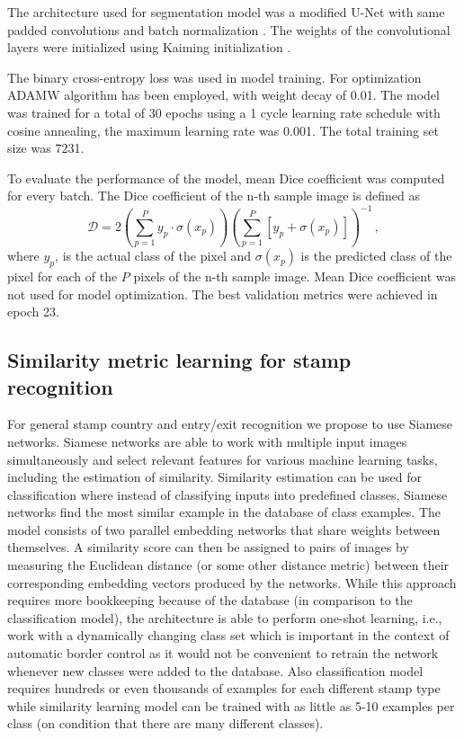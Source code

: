 \documentclass[twocolumn]{svjour3}
\begin{document}
The architecture used for segmentation model was a modified U-Net \cite{ronneberger_u-net_2015} with same padded convolutions and batch normalization \cite{batchnorm}. The weights of the convolutional layers were initialized using Kaiming initialization \cite{kaiming_init}.

The binary cross-entropy loss was used in model training. For optimization ADAMW \cite{adamw} algorithm has been employed, with weight decay of 0.01. The model was trained for a total of 30 epochs using a 1 cycle learning rate schedule \cite{smith_disciplined_2018} with cosine annealing, the maximum learning rate was 0.001. The total training set size was 7231.

To evaluate the performance of the model, mean Dice coefficient was computed for every batch. The Dice coefficient of the n-th sample image is defined as
\begin{equation}
    \mathcal{D} =2\left(\sum_{p=1}^{P}y_p\cdot\sigma(x_p)\right)
    \left(\sum_{p=1}^{P}[y_p + \sigma(x_p)]\right)^{-1}\,,
\end{equation}
where $y_p$, is the actual class of the pixel and $\sigma(x_p)$ is the predicted class of the pixel for each of the $P$ pixels of the n-th sample image. Mean Dice coefficient was not used for model optimization. The best validation metrics were achieved in epoch 23.

\subsection{Similarity metric learning for stamp recognition}
\label{sec:similarity_methods}

For general stamp country and entry/exit recognition we propose to use Siamese networks.
Siamese networks \cite{taigman_deepface_2014} are able to work with multiple input images simultaneously and select relevant features for various machine learning tasks, including the estimation of similarity. Similarity estimation can be used for classification where instead of classifying inputs into predefined classes, Siamese networks find the most similar example in the database of class examples. The model consists of two parallel embedding networks that share weights between themselves. A similarity score can then be assigned to pairs of images by measuring the Euclidean distance (or some other distance metric) between their corresponding embedding vectors produced by the networks. While this approach requires more bookkeeping because of the database (in comparison to the classification model), the architecture is able to perform one-shot learning, i.e., work with a dynamically changing class set which is important in the context of automatic border control as it would not be convenient to retrain the network whenever new classes were added to the database. Also classification model requires hundreds or even thousands of examples for each different stamp type while similarity learning model can be trained with as little as 5-10 examples per class (on condition that there are many different classes).
\end{document}
